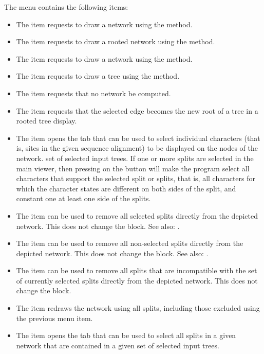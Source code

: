 \documentclass[11pt]{article}
\begin{document}
The  menu contains the following items:
\begin{itemize}
\item The  item
requests to draw a network using the  method.
\item The  item
requests to draw a rooted network using the  method.
\item The  item
requests to draw a network using the  method.
\item The  item
requests to draw a tree using the  method.
\item The  item
requests that no network be computed.
\item The  item
requests that the selected edge becomes the new root of a tree in a rooted tree display.
\item The  item
opens the  tab that can be used
to select individual characters (that is, sites in the given sequence
alignment) to be displayed on the nodes of the network.
set of selected input trees.
If one or more splits are selected in the main viewer, then
pressing on the  button
will make the program select all characters that support the selected
split or splits, that is, all characters for which the character
states are different on both sides of the split, and constant one
at least one side of the splits.
\item The  item
can be used to remove all selected splits directly
from the depicted network. This does not change the  block.
See also: .
\item The  item
can be used to remove all non-selected splits directly
from the depicted network. This does not change the  block.
See also: .
\item The  item
can be used to remove all splits that are incompatible with the set of currently selected
splits directly
from the depicted network. This does not change the  block.
\item The  item redraws the network
using all splits, including those excluded using the previous menu item.
\item The  item
opens the  tab that can be used
to select all splits in a given network that are contained in a given
set of selected input trees.
\end{itemize}
\end{document}
